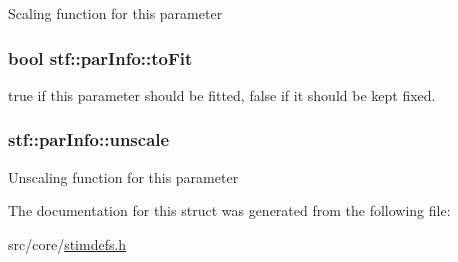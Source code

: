 \label{structstf_1_1parInfo_abfcd4e222d78f17e915b587457c98a37}
Scaling function for this parameter \hypertarget{structstf_1_1parInfo_a204d67206f39c8e7a2efcfbd757f447b}{
\subsubsection[{toFit}]{\setlength{\rightskip}{0pt plus 5cm}bool {\bf stf::parInfo::toFit}}}
\label{structstf_1_1parInfo_a204d67206f39c8e7a2efcfbd757f447b}
true if this parameter should be fitted, false if it should be kept fixed. \hypertarget{structstf_1_1parInfo_a5c3e4eecc13bbd9351ee862c1ddc9829}{
\subsubsection[{unscale}]{ {\bf stf::parInfo::unscale}}}
\label{structstf_1_1parInfo_a5c3e4eecc13bbd9351ee862c1ddc9829}
Unscaling function for this parameter 

The documentation for this struct was generated from the following file:\begin{DoxyCompactItemize}
\item 
src/core/\hyperlink{stimdefs_8h}{stimdefs.h}\end{DoxyCompactItemize}
